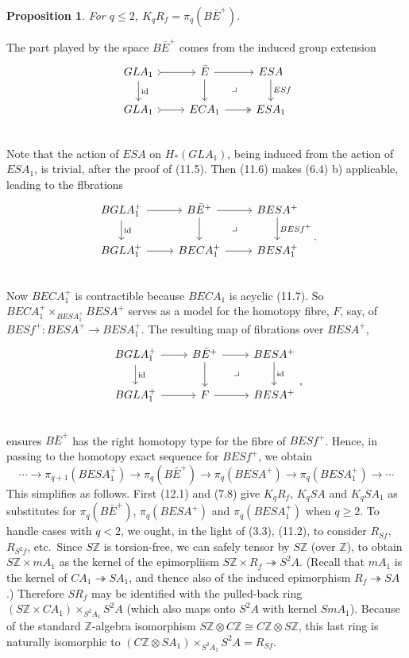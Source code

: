 \documentclass[openany,leqno]{book}  %
\newcommand{\id}{\mathrm{id}} %
\newcommand{\Z}{\mathbb{Z}}
\newtheorem{prop}[theorem]{Proposition}
\begin{document}
\begin{prop}
 	For $q \leqslant 2$, $K_qR_f = \pi_q(B\bar{E}^+)$.
 \end{prop} 

The part played by the space $B\bar{E}^+$ comes from the induced group extension 
\[
\begin{tikzcd}
GLA_1 \arrow[r,tail] \arrow[d,"\id"]&\bar{E} \arrow{r} \arrow{d} \arrow[dr, phantom, "\lrcorner"] & ESA \arrow{d}{ESf}\\
GLA_1 \arrow[r,tail]&ECA_1 \arrow[two heads]{r} & ESA_1 \\
\end{tikzcd}
\]
Note that the action of $ESA$ on $H_*(GLA_1)$, being induced from the action of $ESA_1$, is trivial, after the proof of (11.5). Then (11.6) makes (6.4) b) applicable, leading to the flbrations
\[
\begin{tikzcd}
BGLA_1^+ \arrow[r] \arrow[d,"\id"]&B\bar{E}^+ \arrow{r} \arrow{d} \arrow[dr, phantom, "\lrcorner"] & BESA^+ \arrow{d}{BESf^+}\\
BGLA_1^+ \arrow[r]&BECA_1^+ \arrow{r} & BESA_1^+ \\
\end{tikzcd}.
\]
Now $BECA_1^+$ is contractible because $BECA_1$ is acyclic (11.7). So $BECA_1^+\times_{BESA_1^+} BESA^+ $ serves as a model for the homotopy fibre, $F$, say, of $BESf^+ \colon   BESA^+ \longrightarrow BESA_1^+$. The resulting map of fibrations over $BESA^+$,
\[
\begin{tikzcd}
BGLA_1^+ \arrow[r] \arrow[d,"\id"]&B\bar{E}^+ \arrow{r} \arrow{d} \arrow[dr, phantom, "\lrcorner"] & BESA^+ \arrow{d}{\id}\\
BGLA_1^+ \arrow[r]&F \arrow{r} & BESA^+ \\
\end{tikzcd},
\]
ensures $B\bar{E}^+$ has the right homotopy type for the fibre of $BESf^+$. Hence, in passing to the homotopy exact sequence for $BESf^+$, we obtain
\[\cdots \longrightarrow \pi_{q+1}(BESA_1^+)\longrightarrow  \pi_q(B\bar{E}^+) \longrightarrow  \pi_q(BESA^+) \longrightarrow  \pi_q(BESA_1^+) \longrightarrow \cdots\]
This simplifies as follows. First (12.1) and (7.8) give $K_qR_f$, $K_qSA$ and $K_qSA_1$ as substitutes for $\pi_q(B\bar{E}^+)$, $\pi_q(BESA^+)$ and $\pi_q(BESA_1^+)$ when $q \geqslant 2$. To handle cases with $q < 2$, we ought, in the light of (3.3), (11.2), to consider $R_{Sf}$, $R_{S^2f}$, etc.\  Since $S\Z$ is torsion-free, wc can safely tensor by $S\Z$ (over $\Z$), to obtain $S\Z \times mA_1$ as the kernel of the epimorpliism $S\Z \times R_f \twoheadrightarrow S^2A$. (Recall that $mA_1$ is the kernel of $CA_1\twoheadrightarrow SA_1$, and thence also of the induced epimorphism
$R_f \twoheadrightarrow SA$.) Therefore $SR_f$ may be identified with the pulled-back ring $(S\Z \times CA_1) \times_{S^2A_1} S^2A$ (which also maps onto $S^2A$ with kernel $SmA_1$). Because of the standard $\Z$-algebra isomorphism
$S\Z \otimes C\Z  \cong C\Z \otimes S\Z$, this last ring is naturally isomorphic to $(C\Z \otimes SA_1) \times_{S^2A_1} S^2A = R_{Sf}$.
\end{document}
